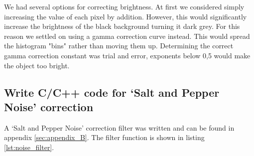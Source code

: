 We had several options for correcting brightness. At first we considered simply increasing the value of each pixel by addition. However, this would significantly increase the brightness of the black background turning it dark grey. For this reason we settled on using a gamma correction curve instead. This would spread the histogram "bins" rather than moving them up. Determining the correct gamma correction constant was trial and error, exponents below 0,5 would make the object too bright. 

\subsection{Write C/C++ code for ‘Salt and Pepper Noise’ correction}

A ‘Salt and Pepper Noise’ correction filter was written and can be found in appendix \ref{sec:appendix_B}. The filter function is shown in listing \ref{lst:noise_filter}.

